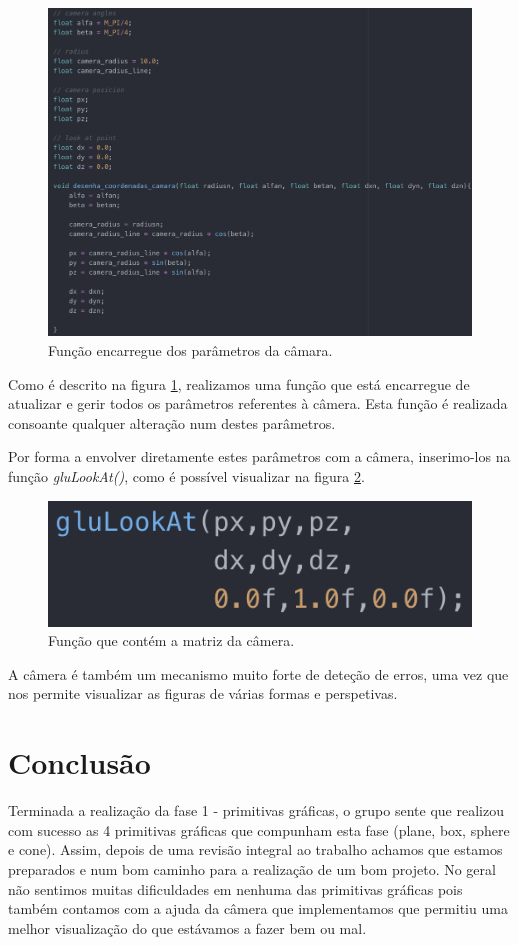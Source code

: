 \documentclass[a4paper]{article}
\begin{document}
\begin{figure}[H]
\centering
\includegraphics[scale=0.40]{funcao_desenha.png}
\caption{Função encarregue dos parâmetros da câmara.}
\label{img:desenha}
\end{figure}

Como é descrito na figura \ref{img:desenha}, realizamos uma função que está encarregue de atualizar e gerir todos os parâmetros referentes à câmera. Esta função é realizada consoante qualquer alteração num destes parâmetros.

Por forma a envolver diretamente estes parâmetros com a câmera, inserimo-los na função \emph{gluLookAt()}, como é possível visualizar na figura \ref{img:glulookat}.

\begin{figure}[H]
\centering
\includegraphics[scale=0.70]{gluLookAt.png}
\caption{Função que contém a matriz da câmera.}
\label{img:glulookat}
\end{figure}

A câmera é também um mecanismo muito forte de deteção de erros, uma vez que nos permite visualizar as figuras de várias formas e perspetivas.


\section{Conclusão}
\label{sec:conclusao}

Terminada a realização da fase 1 - primitivas gráficas, o grupo sente que realizou com sucesso  as 4 primitivas gráficas que compunham esta fase (plane, box, sphere e cone).  Assim, depois de uma revisão integral ao trabalho achamos que estamos preparados e num bom caminho para a realização de um bom projeto.
No geral não sentimos muitas dificuldades em nenhuma das primitivas gráficas pois também contamos com a ajuda da câmera que implementamos que permitiu uma melhor visualização do que estávamos a fazer bem ou mal.
\end{document}
